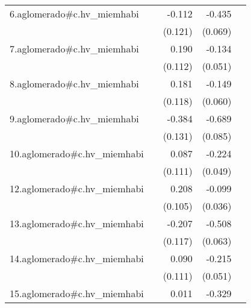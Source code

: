 {\begin{longtable}{l*{4}{D{.}{.}{-1}}}
\addlinespace
6.aglomerado#c.hv\_miemhabi&                     &      -0.112         &      -0.435\sym{***}&                     \\
            &                     &     (0.121)         &     (0.069)         &                     \\
\addlinespace
7.aglomerado#c.hv\_miemhabi&                     &       0.190         &      -0.134\sym{**} &                     \\
            &                     &     (0.112)         &     (0.051)         &                     \\
\addlinespace
8.aglomerado#c.hv\_miemhabi&                     &       0.181         &      -0.149\sym{*}  &                     \\
            &                     &     (0.118)         &     (0.060)         &                     \\
\addlinespace
9.aglomerado#c.hv\_miemhabi&                     &      -0.384\sym{**} &      -0.689\sym{***}&                     \\
            &                     &     (0.131)         &     (0.085)         &                     \\
\addlinespace
10.aglomerado#c.hv\_miemhabi&                     &       0.087         &      -0.224\sym{***}&                     \\
            &                     &     (0.111)         &     (0.049)         &                     \\
\addlinespace
12.aglomerado#c.hv\_miemhabi&                     &       0.208\sym{*}  &      -0.099\sym{**} &                     \\
            &                     &     (0.105)         &     (0.036)         &                     \\
\addlinespace
13.aglomerado#c.hv\_miemhabi&                     &      -0.207         &      -0.508\sym{***}&                     \\
            &                     &     (0.117)         &     (0.063)         &                     \\
\addlinespace
14.aglomerado#c.hv\_miemhabi&                     &       0.090         &      -0.215\sym{***}&                     \\
            &                     &     (0.111)         &     (0.051)         &                     \\
\addlinespace
15.aglomerado#c.hv\_miemhabi&                     &       0.011         &      -0.329\sym{***}&                     \\

\end{longtable}}
